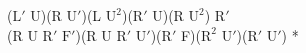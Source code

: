 ($\text{L}'$ U)(R $\text{U}'$)(L $\text{U}^2$)($\text{R}'$ U)(R $\text{U}^2$) $\text{R}'$\\
(R U $\text{R}'$ $\text{F}'$)(R U $\text{R}'$ $\text{U}'$)($\text{R}'$ F)($\text{R}^2$ $\text{U}'$)($\text{R}'$ $\text{U}'$) *\\
